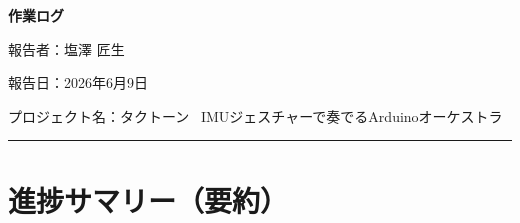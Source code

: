 \documentclass[uplatex,dvipdfmx,a4paper,11pt]{jsarticle}
\newcommand{\sectionrule}{\par\medskip\noindent\rule{\linewidth}{0.6pt}\par\medskip}
\begin{document}
{\LARGE\bfseries 作業ログ}\par\bigskip

報告者：塩澤 匠生

報告日：2026年6月9日

プロジェクト名：タクトーン~ IMUジェスチャーで奏でるArduinoオーケストラ~ \\

\sectionrule

\section{進捗サマリー（要約）}
\end{document}
